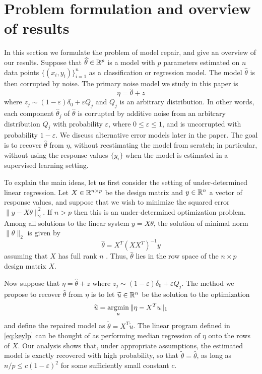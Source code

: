 \let\epsilon\varepsilon
\def\point#1{\vskip10pt\noindent{\it\bfseries #1.}\enspace}
\def\L{{\mathcal L}}

\section{Problem formulation and overview of results}
\label{sec:overview}

In this section we formulate the problem of model repair, and give an overview of our results. Suppose that $\widehat\theta \in \mathbb{R}^p$ is a model with $p$ parameters estimated on $n$ data points $\{(x_i, y_i)\}_{i=1}^n$ as a classification or regression model. The model $\hat\theta$ is then corrupted by noise. The primary noise model we study in this paper is
\begin{equation}
  \eta = \hat\theta + z
\end{equation}
where $z_j \sim (1-\epsilon) \delta_0 + \epsilon Q_j$ and $Q_j$ is an arbitrary distribution. In other words, each component $\hat\theta_j$ of $\hat\theta$ is corrupted by additive noise from an arbitrary distribution $Q_j$ with probability $\epsilon$, where $0\leq \epsilon \leq 1$, and is uncorrupted with probability $1-\epsilon$. We discuss alternative error models later in the paper. The goal is to recover $\hat\theta$ from $\eta$, without reestimating the model from scratch; in particular, without using the response values $\{y_i\}$ when the model is estimated in a supervised learning setting.

\point{Overparameterized linear models}
To explain the main ideas, let us first consider the setting of under-determined linear regression. Let $X\in\mathbb{R}^{n\times p}$ be the design matrix and $y\in\mathbb{R}^n$ a vector of response values, and suppose that we wish to minimize the squared error  $\|y-X\theta\|_2^2$. If $n > p$ then this is an under-determined optimization problem. Among all solutions to the linear system $y = X\theta$, the solution of minimal norm $\|\theta\|_2$ is given by
\begin{equation}
  \hat \theta = X^T (X X^T)^{-1} y \label{eq:min-norm-solution}
\end{equation}
assuming that $X$ has full rank $n$ \citep{boyd:04}. Thus, $\hat\theta$ lies in the row space of the $n\times p$ design matrix $X$.

Now suppose that $\eta = \hat\theta + z$ where $z_j \sim (1-\epsilon) \delta_0 + \epsilon Q_j$. The method we propose to recover $\hat\theta$ from $\eta$ is to let $\widetilde u\in\mathbb{R}^n$ be the solution to the optimization
\begin{equation}
  \tilde u = \argmin_u \| \eta  - X^T u\|_1
  \label{eq:keylp}
\end{equation}
and define the repaired model as $\tilde\theta = X^T\tilde u$.
The linear program defined in \eqref{eq:keylp} can be thought of as performing median regression of $\eta$ onto the rows of $X$.
Our analysis shows that, under appropriate assumptions, the estimated model is exactly recovered with high probability, so that $\tilde \theta = \hat\theta$, as long as $n/p \leq c(1-\epsilon)^2$ for some sufficiently small constant $c$.

